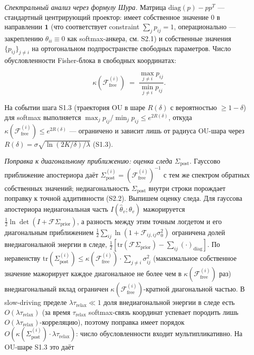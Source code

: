 \documentclass[pdflatex,sn-mathphys-ay]{sn-jnl}
\begin{document}
\emph{Спектральный анализ через формулу Шура.} Матрица \(\text{diag}(p) - pp^T\) --- стандартный центрирующий проектор: имеет собственное значение \(0\) в направлении \(\mathbf{1}\) (что соответствует constraint \(\sum_j p_{ij} = 1\), операционально --- закреплению \(\theta_{ii} \equiv 0\) как softmax-анкера, см. S2.1) и собственные значения \(\{p_{ij}\}_{j \ne i}\) на ортогональном подпространстве свободных параметров. Число обусловленности Fisher-блока в свободных координатах:



\begin{equation}\kappa(\mathcal{F}^{(i)}_{\text{free}}) \;=\; \frac{\max_{j \ne i} p_{ij}}{\min_{j \ne i} p_{ij}}. \tag{S2.2a}\end{equation}



На событии шага S1.3 (траектория OU в шаре \(R(\delta)\) с вероятностью \(\ge 1-\delta\)) для softmax выполняется \(\max_j p_{ij} / \min_j p_{ij} \le e^{2R(\delta)}\), откуда \(\kappa(\mathcal{F}^{(i)}_{\text{free}}) \le e^{2R(\delta)}\) --- ограничено и зависит лишь от радиуса OU-шара через \(R(\delta) = \sigma\sqrt{\ln(2K/\delta)/\lambda}\) (S1.3).



\emph{Поправка к диагональному приближению: оценка следа \(\Sigma_{\text{post}}\).} Гауссово приближение апостериора даёт \(\Sigma_{\text{post}}^{(i)} = (\mathcal{F}^{(i)}_{\text{free}})^{-1}\) с тем же спектром обратных собственных значений; недиагональность \(\Sigma_{\text{post}}\) внутри строки порождает поправку к точной аддитивности (S2.2). Выпишем оценку следа. Для гауссова апостериора недиагональная часть \(I(\hat\theta_v;\theta_v)\) мажорируется \(\tfrac12\ln\det(I + \mathcal{F}\Sigma_{\text{prior}})\), а разность между этим точным логдетом и его диагональным приближением \(\tfrac12\sum_{ij}\ln(1 + \mathcal{F}_{ij,ij}\sigma_0^2)\) ограничена долей внедиагональной энергии в следе, \(\tfrac12[\text{tr}(\mathcal{F}\Sigma_{\text{prior}}) - \sum_{ij}(\cdot)_{\text{diag}}]\). По неравенству \(\text{tr}(\Sigma_{\text{post}}^{(i)}) \le \kappa(\mathcal{F}^{(i)}_{\text{free}}) \cdot \sum_{j\ne i}\sigma_{ij}^2\) (максимальное собственное значение мажорирует каждое диагональное не более чем в \(\kappa(\mathcal{F}^{(i)}_{\text{free}})\) раз) внедиагональный вклад ограничен \(\kappa(\mathcal{F}^{(i)}_{\text{free}})\)-кратной диагональной частью. В slow-driving пределе \(\lambda \tau_{\text{relax}} \ll 1\) доля внедиагональной энергии в следе есть \(O(\lambda\tau_{\text{relax}})\) (за время \(\tau_{\text{relax}}\) softmax-связь координат успевает породить лишь \(O(\lambda\tau_{\text{relax}})\)-корреляцию), поэтому поправка имеет порядок \(O(\kappa(\Sigma_{\text{post}}^{(i)}) \cdot \lambda \tau_{\text{relax}})\): число обусловленности входит мультипликативно. На OU-шаре S1.3 это даёт
\end{document}
